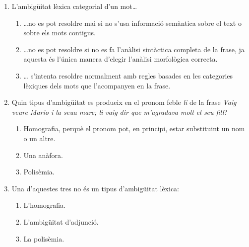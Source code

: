 \begin{enumerate}

\item L'ambigüitat lèxica categorial d'un mot{\ldots}
  \begin{enumerate}
  \item {\ldots}no es pot resoldre mai si no s'usa informació
    semàntica sobre el text o sobre els mots contigus.
  \item {\ldots}no es pot resoldre si no es fa l'anàlisi sintàctica
    completa de la frase, ja aquesta és l'única manera d'elegir
    l'anàlisi morfològica correcta.
  \item {\ldots} s'intenta resoldre normalment amb regles basades en
    les categories lèxiques dels mots que l'acompanyen en la frase.
  \end{enumerate}

\item Quin tipus d'ambigüitat es produeix en el pronom feble \emph{li}
  de la frase \emph{Vaig veure Mario i la seua mare; li vaig dir que
    m'agradava molt el seu fill}?
  \begin{enumerate}
  \item Homografia, perquè el pronom pot, en principi, estar
    substituint un nom o un altre.
  \item Una anàfora.
  \item Polisèmia.
  \end{enumerate}

\item Una d'aquestes tres no és un tipus d'ambigüitat lèxica:
  \begin{enumerate}
  \item L'homografia.
  \item L'ambigüitat d'adjunció.
  \item La polisèmia.
  \end{enumerate}


\end{enumerate}
